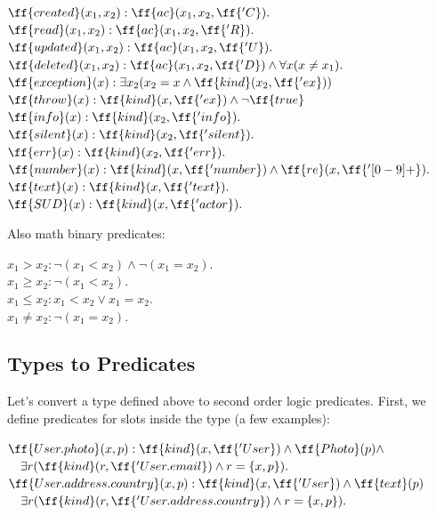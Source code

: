 \documentclass[12pt,oneside,letterpaper]{article}
\begin{document}
\begin{maths}
$\ff{created}(x_1, x_2): \ff{ac}(x_1, x_2, \ff{'C}). $ \\
$\ff{read}(x_1, x_2): \ff{ac}(x_1, x_2, \ff{'R}). $ \\
$\ff{updated}(x_1, x_2): \ff{ac}(x_1, x_2, \ff{'U}). $ \\
$\ff{deleted}(x_1, x_2): \ff{ac}(x_1, x_2, \ff{'D}) \wedge \forall x (x \neq x_1). $ \\
$\ff{exception}(x): \exists x_2 (x_2 = x \wedge \ff{kind}(x_2, \ff{'ex}))$ \\
$\ff{throw}(x): \ff{kind}(x, \ff{'ex}) \wedge \neg \ff{true}$ \\
$\ff{info}(x): \ff{kind}(x_2, \ff{'info}). $ \\
$\ff{silent}(x): \ff{kind}(x_2, \ff{'silent}). $ \\
$\ff{err}(x): \ff{kind}(x_2, \ff{'err}). $ \\
$\ff{number}(x): \ff{kind}(x, \ff{'number}) \wedge \ff{re}(x, \ff{'[0-9]+}).$ \\
$\ff{text}(x): \ff{kind}(x, \ff{'text}).$ \\
$\ff{SUD}(x): \ff{kind}(x, \ff{'actor}).$ \\
\end{maths}

Also math binary predicates:

\begin{maths}
$x_1 > x_2: \neg(x_1 < x_2) \wedge \neg(x_1 = x_2). $ \\
$x_1 \geq x_2: \neg (x_1 < x_2). $ \\
$x_1 \leq x_2: x_1 < x_2 \vee x_1 = x_2. $ \\
$x_1 \neq x_2: \neg (x_1 = x_2). $ \\
\end{maths}

\subsection{Types to Predicates}

Let's convert a type defined above to second order logic predicates.
First, we define predicates for slots inside the type (a few examples):

\begin{maths}
$\ff{User.photo}(x, p): \ff{kind}(x, \ff{'User}) \wedge \ff{Photo}(p) \wedge$ \\
$\quad \exists r (\ff{kind}(r, \ff{'User.email}) \wedge r = \{x, p\}). $ \\
$\ff{User.address.country}(x, p): \ff{kind}(x, \ff{'User}) \wedge \ff{text}(p)$ \\
$\quad \exists r (\ff{kind}(r, \ff{'User.address.country}) \wedge r = \{x, p\}). $ \\
\end{maths}
\end{document}
